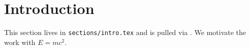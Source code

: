 \section{Introduction}
This section lives in \texttt{sections/intro.tex} and is pulled via \verb||.
We motivate the work with $E = mc^2$.
